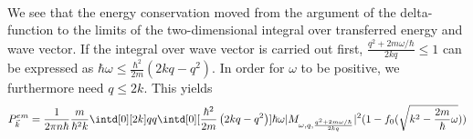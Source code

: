 \documentclass[physics,phd,nolot,nolof]{uccthesis}%
\begin{document}
{\begin{equation}
\begin{split}
  \label{eq:Scattering-rate3}
  \end{split}
\end{equation}
We see that the energy conservation moved from the argument of the delta-function
to the limits of the two-dimensional integral over transferred energy and wave vector.
If the integral over wave vector is carried out first, 
$\frac{q^2 +2m\omega/\hbar}{2kq}\leq 1$
can be expressed as
$\hbar\omega\leq \frac{\hbar^2}{2m}\left(2kq-q^2\right)$. 
In order for $\omega$ to be positive, we furthermore need $q\leq2k$.
This yields
\begin{equation}
  P^{em}_{\vec k} 
  =\frac{1}{ 2\pi n \hbar}
  \frac{m}{\hbar^2 k}
  \intd[0][2k]q q
  \intd[0][\frac{\hbar^2}{2m}\left(2kq-q^2\right)]{\hbar\omega}
  |M_{\omega,q, \frac{q^2 +2m\omega/\hbar}{2kq}}|^2
(1-f_0( \sqrt{k^2 -\frac{2m}{\hbar}\omega})) 
  \label{eq:Scattering-rate4}
\end{equation}
}
\end{document}
